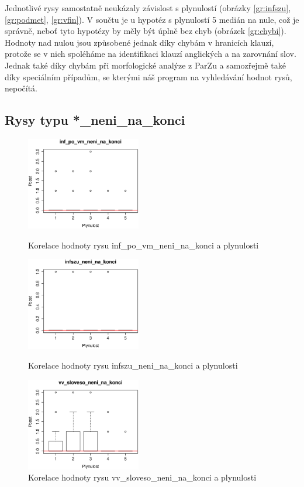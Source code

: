 \documentclass[12pt,a4paper]{report}
\begin{document}
Jednotlivé rysy samostatně neukázaly závislost s plynulostí (obrázky \ref{gr:infszu}, \ref{gr:podmet}, \ref{gr:vfin}). V součtu je u hypotéz s plynulostí 5 medián na nule, což je správně, neboť tyto hypotézy by měly být úplně bez chyb (obrázek \ref{gr:chybi}). Hodnoty nad nulou jsou způsobené jednak díky chybám v hranicích klauzí, protože se v nich spoléháme na identifikaci klauzí anglických a na zarovnání slov. Jednak také díky chybám při morfologické analýze z ParZu a samozřejmě také díky speciálním případům, se kterými náš program na vyhledávání hodnot rysů, nepočítá.

\pagebreak


\subsection{Rysy typu *\_neni\_na\_konci}
\begin{figure}[!htb]
  \centering\includegraphics[width=50mm]{./grafy/rysy/inf_po_vm_neni_na_konci.eps}
  \caption{Korelace hodnoty rysu inf\_po\_vm\_neni\_na\_konci a plynulosti}\label{gr:vm}
\endminipage\hfill
{}
  \centering\includegraphics[width=50mm]{./grafy/rysy/infszu_neni_na_konci.eps}
  \caption{Korelace hodnoty rysu infszu\_neni\_na\_konci a plynulosti}\label{gr:infszu_konec}
\endminipage\hfill
{}
  \centering\includegraphics[width=50mm]{./grafy/rysy/vv_sloveso_neni_na_konci.eps}
  \caption{Korelace hodnoty rysu vv\_sloveso\_neni\_na\_konci a plynulosti}\label{gr:vvsloveso}
\endminipage\hfill
\end{figure}
\end{document}
